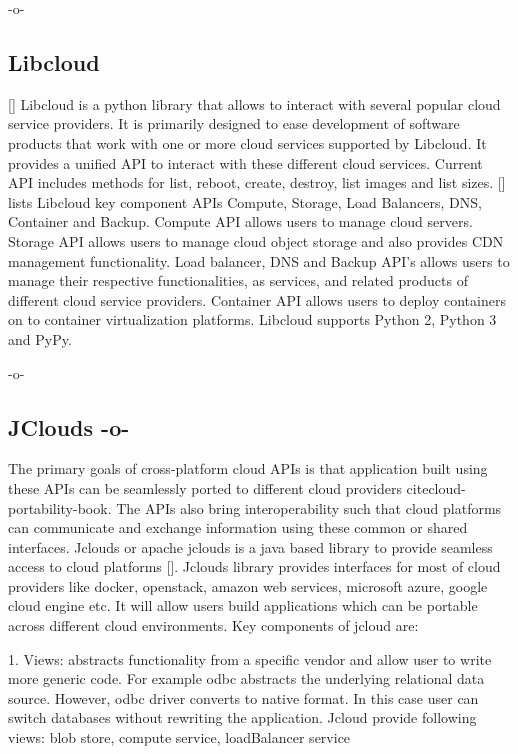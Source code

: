      -o-
     
\subsection{Libcloud}

[\cite{www-libcloudwiki}] Libcloud is a python library that allows to
interact with several popular cloud service providers. It is primarily
designed to ease development of software products that work with one
or more cloud services supported by Libcloud. It provides a unified
API to interact with these different cloud services. Current API
includes methods for list, reboot, create, destroy, list images and
list sizes. [\cite{www-libclouddoc}] lists Libcloud key component APIs
Compute, Storage, Load Balancers, DNS, Container and Backup. Compute
API allows users to manage cloud servers. Storage API allows users to
manage cloud object storage and also provides CDN management
functionality. Load balancer, DNS and Backup API's allows users to
manage their respective functionalities, as services, and related
products of different cloud service providers. Container API allows
users to deploy containers on to container virtualization
platforms. Libcloud supports Python 2, Python 3 and PyPy.

     -o-
     
\subsection{JClouds -o-}

The primary goals of cross-platform cloud APIs is that application
built using these APIs can be seamlessly ported to different cloud
providers cite{cloud-portability-book}.  The APIs also bring
interoperability such that cloud platforms can communicate and
exchange information using these common or shared interfaces.  Jclouds
or apache jclouds is a java based library to provide seamless access
to cloud platforms [\cite{www-jclouds}].  Jclouds library provides
interfaces for most of cloud providers like docker, openstack, amazon
web services, microsoft azure, google cloud engine etc. It will allow
users build applications which can be portable across different cloud
environments.  Key components of jcloud are:

     1. Views: abstracts functionality from a specific vendor and
        allow user to write more generic code. For example odbc
        abstracts the underlying relational data source. However, odbc
        driver converts to native format. In this case user can switch
        databases without rewriting the application. Jcloud provide
        following views: blob store, compute service, loadBalancer
        service

